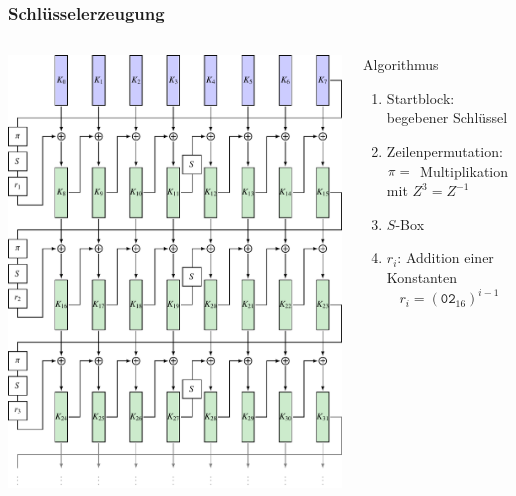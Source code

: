 %
%
%
\bgroup
\begin{frame}[t]
\setlength{\abovedisplayskip}{5pt}
\setlength{\belowdisplayskip}{5pt}
\frametitle{Schlüsselerzeugung}
\vspace{-20pt}
\begin{columns}[t,onlytextwidth]
\begin{column}{0.48\textwidth}
\begin{center}
\includegraphics[width=\textwidth]{../../buch/chapters/90-crypto/images/keys.pdf}
\end{center}
\end{column}
\begin{column}{0.48\textwidth}
\begin{block}{Algorithmus}
\begin{enumerate}
\item<2->
Startblock: begebener Schlüssel
\item<3->
Zeilenpermutation:
$\pi=\mathstrut$ Multiplikation mit $Z^3=Z^{-1}$
\item<4-> $S$-Box
\item<5-> $r_i$: Addition einer Konstanten
\[
r_i = (\texttt{02}_{16})^{i-1}
\]
\end{enumerate}
\end{block}
\end{column}
\end{columns}
\end{frame}
\egroup
